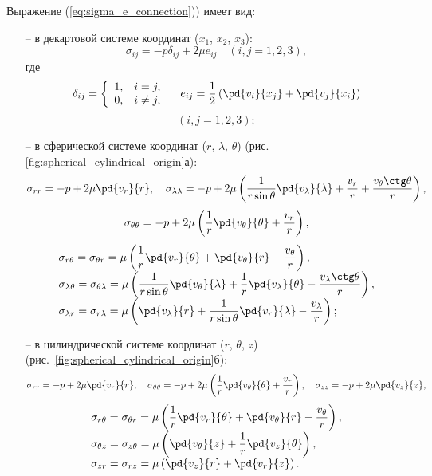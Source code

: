 \documentclass[14pt]{extarticle}
\begin{document}
Выражение (\ref{eq:sigma_e_connection})) имеет вид:
\begin{itemize}
	\item[--] в декартовой системе координат ($x_1$, $x_2$, $x_3$):
		\[
			\sigma_{ij} = -p\delta_{ij} + 2 \mu e_{ij}\quad (i,j = 1,2,3),	
		\]
		где
		\[
			\delta_{ij} = 
			\left\{
			\begin{array}{cl}
				1, & i = j,\\
				0, & i \neq j,\\
			\end{array}
			\right.\quad
			e_{ij} = \frac{1}{2}\left(
			\pd{v_i}{x_j}+\pd{v_j}{x_i}
			\right)
		\]
		\[
			(i,j = 1,2,3);
		\]
		
	\item[--] в сферической системе координат ($r$, $\lambda$, $\theta$) (рис. \ref{fig:spherical_cylindrical_origin}а):
	\[
	\sigma_{rr} = -p +2\mu\pd{v_r}{r},\quad 
	\sigma_{\lambda\lambda} = -p + 2\mu 
	\left(
		\frac{1}{r\sin\theta} \pd{v_\lambda}{\lambda} + \frac{v_r}{r} + \frac{v_\theta \ctg\theta}{r}
	\right),
	\]
	\[
	\sigma_{\theta\theta} = -p + 2\mu \left(
	\frac{1}{r} \pd{v_\theta}{\theta} + \frac{v_r}{r}
	\right),
	\]
	\[
	\begin{array}{l}
	\sigma_{r\theta} = \sigma_{\theta r} = \displaystyle \mu\left(
	\frac{1}{r} \pd{v_r}{\theta} + \pd{v_\theta}{r} - \frac{v_\theta}{r}
	\right), \\
	\sigma_{\lambda\theta} =  \sigma_{\theta\lambda}= \displaystyle \mu \left(
	\frac{1}{r\sin\theta} \pd{v_\theta}{\lambda} + \frac{1}{r}\pd{v_\lambda}{\theta} - \frac{v_\lambda \ctg\theta}{r}
	\right),\\
	\sigma_{\lambda r} =  \sigma_{r\lambda}= \displaystyle \mu \left(
	 \pd{v_\lambda}{r} + \frac{1}{r\sin\theta}\pd{v_r}{\lambda} - \frac{v_\lambda}{r}
	\right);
	\end{array}
	\]
	
	\item[--] в цилиндрической системе координат ($r$, $\theta$, $z$) (рис.~\ref{fig:spherical_cylindrical_origin}б):
	\[
	\sigma_{rr} = -p + 2 \mu \pd{v_r}{r},\quad
	\sigma_{\theta\theta} = -p + 2\mu \left( \frac{1}{r} \pd{v_\theta}{\theta} +\frac{v_r}{r} \right),\quad
	\sigma_{zz} = -p + 2\mu \pd{v_z}{z},
	\]
	\[
	\begin{array}{l}
		\sigma_{r\theta} = \sigma_{\theta r} = \displaystyle \mu\left(
		\frac{1}{r} \pd{v_r}{\theta} + \pd{v_\theta}{r} - \frac{v_\theta}{r}
		\right), \\
		\sigma_{\theta z} =  \sigma_{z\theta}= \displaystyle \mu \left(
		 \pd{v_\theta}{z} + \frac{1}{r}\pd{v_z}{\theta} 
		\right),\\
		\sigma_{zr} =  \sigma_{rz}= \displaystyle \mu \left(
		\pd{v_z}{r} + \pd{v_r}{z}
		\right).
	\end{array}
	\]
\end{itemize}
\end{document}
